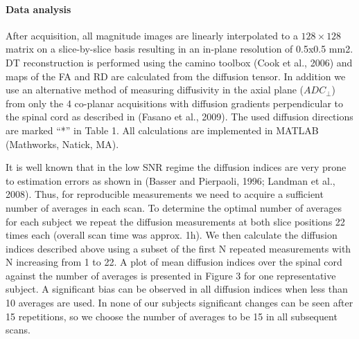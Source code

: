 \paragraph{Data analysis}
After acquisition, all magnitude images are linearly interpolated to a $128\times128$ matrix on a slice-by-slice basis resulting in an in-plane resolution of 0.5x0.5 mm2. DT reconstruction is performed using the camino toolbox (Cook et al., 2006) and maps of the FA and RD are calculated from the diffusion tensor. In addition we use an alternative method of measuring diffusivity in the axial plane ($ADC_\perp$) from only the 4 co-planar acquisitions with diffusion gradients perpendicular to the spinal cord as described in (Fasano et al., 2009).  The used diffusion directions are marked “*” in Table 1. All calculations are implemented in MATLAB (Mathworks, Natick, MA).

It is well known that in the low SNR regime the diffusion indices are very prone to estimation errors as shown in (Basser and Pierpaoli, 1996; Landman et al., 2008). Thus, for reproducible measurements we need to acquire a sufficient number of averages in each scan. To determine the optimal number of averages for each subject we repeat the diffusion measurements at both slice positions 22 times each (overall scan time was approx. 1h). We then calculate the diffusion indices described above using a subset of the first N repeated measurements with N increasing from 1 to 22. A plot of mean diffusion indices over the spinal cord against the number of averages is presented in Figure 3 for one representative subject. A significant bias can be observed in all diffusion indices when less than 10 averages are used. In none of our subjects significant changes can be seen after 15 repetitions, so we choose the number of averages to be 15 in all subsequent scans.

